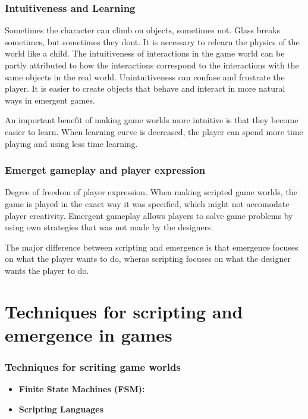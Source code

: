   \subsubsection*{Intuitiveness and Learning}

    Sometimes the character can climb on objects, sometimes not. Glass breaks sometimes, but sometimes they dont. It is necessary to relearn the physics of the world like a child. The intuitiveness of interactions in the game world can be partly attributed to how the interactions correspond to the interactions with the same objects in the real world. Unintuitiveness can confuse and frustrate the player. It is easier to create objects that behave and interact in more natural ways in emergent games. 

    An important benefit of making game worlds more intuitive is that they become easier to learn. When learning curve is decreased, the player can spend more time playing and using less time learning. 

  \subsubsection*{Emerget gameplay and player expression}

    Degree of freedom of player expression.
    When making scripted game worlds, the game is played in the exact way it was specified, which might not accomodate player creativity. Emergent gameplay allows players to solve game problems by using own strategies that was not made by the designers. 

    The major difference between scripting and emergence is that emergence focuses on what the player wants to do, wheras scripting focuses on what the designer wants the player to do. 

\section*{Techniques for scripting and emergence in games}

  \subsubsection*{Techniques for scriting game worlds}

    \begin{itemize}
      \item {\bf Finite State Machines (FSM):}
      \item {\bf Scripting Languages}
    \end{itemize}

